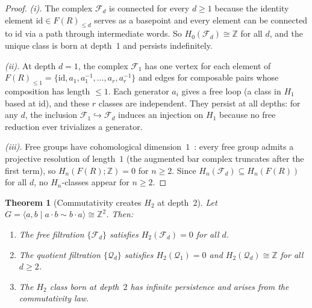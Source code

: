 \documentclass{article}
\newtheorem{theorem}{Theorem}[section]
\theoremstyle{definition}
\theoremstyle{remark}
\newcommand{\id}{\mathrm{id}}
\begin{document}
\begin{proof}
\textit{(i).} The complex $\mathcal{F}_d$ is connected for every
$d \geq 1$ because the identity element $\id \in F(R)_{\leq d}$
serves as a basepoint and every element can be connected to $\id$
via a path through intermediate words. So $H_0(\mathcal{F}_d) \cong \mathbb{Z}$
for all $d$, and the unique class is born at depth~$1$ and
persists indefinitely.

\textit{(ii).} At depth $d = 1$, the complex $\mathcal{F}_1$ has
one vertex for each element of $F(R)_{\leq 1} = \{\id, a_1,
a_1^{-1}, \dots, a_r, a_r^{-1}\}$ and edges for composable pairs
whose composition has length $\leq 1$. Each generator $a_i$ gives
a free loop (a class in $H_1$ based at $\id$), and these $r$
classes are independent. They persist at all depths: for any $d$,
the inclusion $\mathcal{F}_1 \hookrightarrow \mathcal{F}_d$
induces an injection on $H_1$ because no free reduction ever
trivializes a generator.

\textit{(iii).} Free groups have cohomological dimension~$1$~\cite{cohomologicaldim}:
every free group admits a projective resolution of length~$1$
(the augmented bar complex truncates after the first term), so
$H_n(F(R);\mathbb{Z}) = 0$ for $n \geq 2$. Since
$H_n(\mathcal{F}_d) \subseteq H_n(F(R))$ for all $d$, no
$H_n$-classes appear for $n \geq 2$.
\end{proof}

\begin{theorem}[Commutativity creates $H_2$ at depth~2]
\label{thm:commutativity_h2}
Let $G = \langle a, b \mid a \cdot b \sim b \cdot a \rangle \cong
\mathbb{Z}^2$. Then:
\begin{enumerate}[label=(\roman*)]
  \item The free filtration $\{\mathcal{F}_d\}$ satisfies
        $H_2(\mathcal{F}_d) = 0$ for all $d$.
  \item The quotient filtration $\{\mathcal{Q}_d\}$ satisfies
        $H_2(\mathcal{Q}_1) = 0$ and $H_2(\mathcal{Q}_d) \cong
        \mathbb{Z}$ for all $d \geq 2$.
  \item The $H_2$ class born at depth~$2$ has infinite
        persistence and arises from the commutativity law.
\end{enumerate}
\end{theorem}
\end{document}
